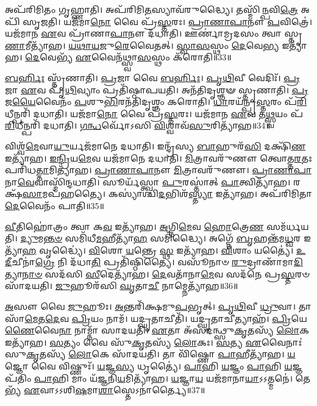 𑌅𑌪᳴𑌰𑌿𑌮𑌿𑌤𑌂 𑌗𑍃𑌹𑍍𑌣𑌾𑌤𑌿।
𑌅𑌪᳴𑌰𑌿𑌮𑌿\-\ul{𑌤}\-𑌸𑍍𑌯𑌾𑌵᳴𑌰𑍁𑌦𑍍𑌧𑍍𑌯𑍈।
𑌤𑌸𑍍𑌮𑌿᳴\-\ul{𑌨𑍍𑌪}\-𑌵𑌿\-\ul{𑌤𑍍𑌰𑍇} 𑌅𑌪𑌿᳴ 𑌸𑍃𑌜𑌤𑌿।
𑌯𑌜᳴𑌮𑌾\-\ul{𑌨𑍋} 𑌵𑍈 𑌪𑍍𑌰᳴\-\ul{𑌸𑍍𑌤}\-𑌰𑌃।
\-\ul{𑌪𑍍𑌰𑌾}\-\-\ul{𑌣𑌾}\-\-\ul{𑌪𑌾}\-𑌨𑍗 \ul{𑌪}\-𑌵𑌿𑌤𑍍𑌰𑍇॑।
𑌯𑌜᳴𑌮𑌾𑌨 \ul{𑌏}\-𑌵 𑌪𑍍𑌰𑌾᳴𑌣𑌾\-\ul{𑌪𑌾}\-𑌨𑍗 𑌦᳴𑌧𑌾𑌤𑌿।
𑌊𑌰𑍍𑌣𑌾॑𑌮𑍍𑌰𑌦𑌸𑌂 𑌤𑍍𑌵𑌾 𑌸𑍍𑌤𑍃\-\ul{𑌣𑌾}\-𑌮𑍀𑌤𑍍𑌯𑌾᳴𑌹।
\-\ul{𑌯}\-\-\ul{𑌥𑌾}\-\-\ul{𑌯}\-𑌜𑍁\-\ul{𑌰𑍇}\-𑌵𑍈𑌤𑌤𑍍।
\-\ul{𑌸𑍍𑌵𑌾}\-\-\ul{𑌸}\-𑌸𑍍𑌥𑌂 \ul{𑌦𑍇}\-𑌵𑍇\-\ul{𑌭𑍍𑌯} 𑌇𑌤𑍍𑌯𑌾᳴𑌹।
\-\ul{𑌦𑍇}\-𑌵𑍇𑌭𑍍𑌯᳴ \ul{𑌏}\-𑌵𑍈𑌨᳴𑌥𑍍𑌸𑍍𑌵𑌾\-\ul{𑌸}\-𑌸𑍍𑌥𑌂 𑌕᳴𑌰𑍋𑌤𑌿॥33॥

\-\ul{𑌬}\-\-\ul{𑌰𑍍}\-𑌹𑌿𑌃 𑌸𑍍𑌤𑍃᳴𑌣𑌾𑌤𑌿।
\-\ul{𑌪𑍍𑌰}\-𑌜𑌾 𑌵𑍈 \ul{𑌬}\-\-\ul{𑌰𑍍}\-𑌹𑌿𑌃।
\-\ul{𑌪𑍃}\-\-\ul{𑌥𑌿}\-𑌵𑍀 𑌵𑍇𑌦𑌿𑌃᳴।
\-\ul{𑌪𑍍𑌰}\-𑌜𑌾 \ul{𑌏}\-𑌵 𑌪𑍃᳴\-\ul{𑌥𑌿}\-𑌵𑍍𑌯𑌾𑌂 𑌪𑍍𑌰𑌤𑌿᳴\-𑌷𑍍𑌠𑌾𑌪𑌯𑌤𑌿।
𑌅𑌨᳴𑌤𑌿𑌦𑍃𑌶𑍍𑌞𑍟 𑌸𑍍𑌤𑍃𑌣𑌾𑌤𑌿।
\-\ul{𑌪𑍍𑌰}\-𑌜\-\ul{𑌯𑍈}\-𑌵𑍈𑌨𑌂᳴ \ul{𑌪}\-𑌶𑍁\-\ul{𑌭𑌿}\-𑌰𑌨᳴𑌤𑌿𑌦𑍃𑌶𑍍𑌞𑌂 𑌕𑌰𑍋𑌤𑌿।
\-\ul{𑌧𑌾}\-𑌰𑌯᳴𑌨𑍍𑌪𑍍𑌰\-\ul{𑌸𑍍𑌤}\-𑌰𑌂 𑌪᳴\-\ul{𑌰𑌿}\-𑌧𑍀𑌨𑍍𑌪𑌰𑌿᳴ 𑌦𑌧𑌾𑌤𑌿।
𑌯𑌜᳴𑌮𑌾\-\ul{𑌨𑍋} 𑌵𑍈 𑌪𑍍𑌰᳴\-\ul{𑌸𑍍𑌤}\-𑌰𑌃।
𑌯𑌜᳴𑌮𑌾𑌨 \ul{𑌏}\-𑌵 𑌤\-\ul{𑌥𑍍𑌸𑍍𑌵}\-𑌯𑌂 𑌪᳴\-\ul{𑌰𑌿}\-𑌧𑍀𑌨𑍍𑌪𑌰𑌿᳴ 𑌦𑌧𑌾𑌤𑌿।
\-\ul{𑌗}\-\-\ul{𑌨𑍍𑌧}\-𑌰𑍍𑌵𑍋᳴𑌽𑌸𑌿 \ul{𑌵𑌿}\-𑌶𑍍𑌵𑌾𑌵᳴\-\ul{𑌸𑍁}\-𑌰𑌿𑌤𑍍𑌯𑌾᳴𑌹॥34॥

𑌵𑌿𑌶𑍍𑌵᳴\-\ul{𑌮𑍇}\-𑌵𑌾\-\ul{𑌯𑍁}\-𑌰𑍍𑌯𑌜᳴𑌮𑌾𑌨𑍇 𑌦𑌧𑌾𑌤𑌿।
𑌇𑌨𑍍𑌦𑍍𑌰᳴𑌸𑍍𑌯 \ul{𑌬𑌾}\-𑌹𑍁𑌰᳴\-\ul{𑌸𑌿} 𑌦𑌕𑍍𑌷𑌿᳴\-\ul{𑌣} 𑌇𑌤𑍍𑌯𑌾᳴𑌹।
\-\ul{𑌇}\-\-\ul{𑌨𑍍𑌦𑍍𑌰𑌿}\-𑌯\-\ul{𑌮𑍇}\-𑌵 𑌯𑌜᳴𑌮𑌾𑌨𑍇 𑌦𑌧𑌾𑌤𑌿।
\-\ul{𑌮𑌿}\-𑌤𑍍𑌰𑌾𑌵𑌰𑍁᳴𑌣𑍗 𑌤𑍍𑌵𑍋𑌤𑍍𑌤\-\ul{𑌰}\-𑌤𑌃 𑌪𑌰𑌿᳴𑌧\-\ul{𑌤𑍍𑌤𑌾}\-𑌮𑌿𑌤𑍍𑌯𑌾᳴𑌹।
\-\ul{𑌪𑍍𑌰𑌾}\-\-\ul{𑌣𑌾}\-\-\ul{𑌪𑌾}\-𑌨𑍗 \ul{𑌮𑌿}\-𑌤𑍍𑌰𑌾𑌵𑌰𑍁᳴𑌣𑍗।
\-\ul{𑌪𑍍𑌰𑌾}\-\-\ul{𑌣𑌾}\-\-\ul{𑌪𑌾}\-𑌨𑌾\-\-\ul{𑌵𑍇}\-𑌵𑌾𑌸𑍍𑌮𑌿᳴𑌨𑍍𑌦\-𑌧𑌾𑌤𑌿।
𑌸𑍂𑌰𑍍𑌯᳴𑌸𑍍𑌤𑍍𑌵𑌾 \ul{𑌪𑍁}\-𑌰𑌸𑍍𑌤𑌾॑𑌤𑍍 \ul{𑌪𑌾}\-𑌤𑍍𑌵𑌿𑌤𑍍𑌯𑌾᳴𑌹।
𑌰𑌕𑍍𑌷᳴\-\ul{𑌸𑌾}\-𑌮𑌪᳴𑌹𑌤𑍍𑌯𑍈।
𑌕𑌸𑍍𑌯𑌾॑𑌶𑍍𑌚𑌿\-\ul{𑌦}\-𑌭𑌿𑌶᳴\-\ul{𑌸𑍍𑌤𑍍𑌯𑌾} 𑌇𑌤𑍍𑌯𑌾᳴𑌹।
𑌅𑌪᳴𑌰𑌿𑌮𑌿𑌤𑌾\-\ul{𑌦𑍇}\-𑌵𑍈𑌨𑌂᳴ 𑌪𑌾𑌤𑌿॥35॥

\-\ul{𑌵𑍀}\-𑌤𑌿𑌹𑍋॑𑌤𑍍𑌰𑌂 𑌤𑍍𑌵𑌾 𑌕\-\ul{𑌵} 𑌇𑌤𑍍𑌯𑌾᳴𑌹।
\-\ul{𑌅}\-𑌗𑍍𑌨𑌿\-\ul{𑌮𑍇}\-𑌵 \ul{𑌹𑍋}\-𑌤𑍍𑌰𑍇\-\ul{𑌣} 𑌸𑌮᳴𑌰𑍍𑌧𑌯𑌤𑌿।
\-\ul{𑌦𑍍𑌯𑍁}\-𑌮\-\ul{𑌨𑍍𑌤}\-\-\ul{𑍞} 𑌸𑌮𑌿᳴𑌧𑍀\-\ul{𑌮}\-𑌹𑍀𑌤𑍍𑌯𑌾᳴\-\ul{𑌹} 𑌸𑌮𑌿᳴𑌦𑍍𑌧𑍍𑌯𑍈।
𑌅𑌗𑍍𑌨𑍇᳴ \ul{𑌬𑍃}\-𑌹𑌨𑍍𑌤᳴𑌮\-\ul{𑌧𑍍𑌵}\-𑌰 𑌇𑌤𑍍𑌯𑌾᳴\-\ul{𑌹} 𑌵𑍃𑌦𑍍𑌧𑍍𑌯𑍈॑।
\-\ul{𑌵𑌿}\-𑌶𑍋 \ul{𑌯}\-𑌨𑍍𑌤𑍍𑌰𑍇 \ul{𑌸𑍍𑌥} 𑌇𑌤𑍍𑌯𑌾᳴𑌹।
\-\ul{𑌵𑌿}\-𑌶𑌾𑌂 𑌯𑌤𑍍𑌯𑍈॑।
\-\ul{𑌉}\-\-\ul{𑌦𑍀}\-𑌚𑍀𑌨𑌾॑\-\ul{𑌗𑍍𑌰𑍇} 𑌨𑌿 𑌦᳴𑌧𑌾\-\ul{𑌤𑌿} 𑌪𑍍𑌰𑌤𑌿᳴\-𑌷𑍍𑌠𑌿𑌤𑍍𑌯𑍈।
𑌵𑌸𑍂᳴𑌨𑌾𑍞 \ul{𑌰𑍁}\-𑌦𑍍𑌰𑌾𑌣𑌾᳴𑌮𑌾\-\ul{𑌦𑌿}\-𑌤𑍍𑌯𑌾\-\ul{𑌨𑌾}\-\-\ul{𑍞} 𑌸𑌦᳴𑌸𑌿 \ul{𑌸𑍀}\-𑌦𑍇𑌤𑍍𑌯𑌾᳴𑌹।
\-\ul{𑌦𑍇}\-𑌵𑌤𑌾᳴𑌨𑌾\-\ul{𑌮𑍇}\-𑌵 𑌸𑌦᳴𑌨𑍇 𑌪𑍍𑌰\-\ul{𑌸𑍍𑌤}\-𑌰𑍞 𑌸𑌾᳴𑌦𑌯𑌤𑌿।
\-\ul{𑌜𑍁}\-𑌹𑍂𑌰᳴𑌸𑌿 \ul{𑌘𑍃}\-𑌤𑌾\-\ul{𑌚𑍀} 𑌨𑌾𑌮𑍍𑌨𑍇𑌤𑍍𑌯𑌾᳴𑌹॥36॥

\-\ul{𑌅}\-𑌸𑍗 𑌵𑍈 \ul{𑌜𑍁}\-𑌹𑍂𑌃।
\-\ul{𑌅}\-𑌨𑍍𑌤𑌰𑌿᳴𑌕𑍍𑌷𑌮𑍁\-\ul{𑌪}\-𑌭𑍃𑌤𑍍।
\-\ul{𑌪𑍃}\-\-\ul{𑌥𑌿}\-𑌵𑍀 \ul{𑌧𑍍𑌰𑍁}\-𑌵𑌾।
𑌤𑌾𑌸𑌾᳴\-\ul{𑌮𑍇}\-𑌤\-\ul{𑌦𑍇}\-𑌵 \ul{𑌪𑍍𑌰𑌿}\-𑌯𑌂 𑌨𑌾𑌮᳴।
𑌯𑌦𑍍\mbox{}\-\ul{𑌘𑍃}\-𑌤𑌾𑌚𑍀𑌤𑌿᳴।
𑌯𑌦𑍍\mbox{}\-\ul{𑌘𑍃}\-𑌤𑌾𑌚𑍀𑌤𑍍𑌯𑌾𑌹᳴।
\-\ul{𑌪𑍍𑌰𑌿}\-𑌯𑍇\-\ul{𑌣𑍈}\-𑌵𑍈\-\ul{𑌨𑌾} 𑌨𑌾𑌮𑍍𑌨𑌾᳴ 𑌸𑌾𑌦𑌯𑌤𑌿।
\-\ul{𑌏}\-𑌤𑌾 𑌅᳴𑌸𑌦𑌨𑍍𑌥𑍍𑌸𑍁\-\ul{𑌕𑍃}\-𑌤𑌸𑍍𑌯᳴ \ul{𑌲𑍋}\-𑌕 𑌇𑌤𑍍𑌯𑌾᳴𑌹।
\-\ul{𑌸}\-𑌤𑍍𑌯𑌂 𑌵𑍈 𑌸𑍁᳴\-\ul{𑌕𑍃}\-𑌤𑌸𑍍𑌯᳴ \ul{𑌲𑍋}\-𑌕𑌃।
\-\ul{𑌸}\-𑌤𑍍𑌯 \ul{𑌏}\-𑌵𑍈𑌨𑌾𑌃॑ 𑌸𑍁\-\ul{𑌕𑍃}\-𑌤𑌸𑍍𑌯᳴ \ul{𑌲𑍋}\-𑌕𑍇 𑌸𑌾᳴𑌦𑌯𑌤𑌿।
𑌤𑌾 𑌵𑌿᳴𑌷𑍍𑌣𑍋 \ul{𑌪𑌾}\-𑌹𑍀𑌤𑍍𑌯𑌾᳴𑌹।
\-\ul{𑌯}\-𑌜𑍍𑌞𑍋 𑌵𑍈 𑌵𑌿𑌷𑍍𑌣𑍁𑌃᳴।
\-\ul{𑌯}\-𑌜𑍍𑌞\-\ul{𑌸𑍍𑌯} 𑌧𑍃𑌤𑍍𑌯𑍈॑।
\-\ul{𑌪𑌾}\-𑌹𑌿 \ul{𑌯}\-𑌜𑍍𑌞𑌂 \ul{𑌪𑌾}\-𑌹𑌿 \ul{𑌯}\-𑌜𑍍𑌞𑌪᳴𑌤𑌿𑌂 \ul{𑌪𑌾}\-𑌹𑌿 𑌮𑌾𑌂 𑌯᳴\-\ul{𑌜𑍍𑌞}\-𑌨𑌿\-\ul{𑌯}\-𑌮𑌿𑌤𑍍𑌯𑌾᳴𑌹।
\-\ul{𑌯}\-𑌜𑍍𑌞𑌾\-\ul{𑌯} 𑌯𑌜᳴𑌮𑌾𑌨𑌾\-\ul{𑌯𑌾}\-𑌽𑌽𑌤𑍍𑌮𑌨𑍇॑।
𑌤𑍇𑌭𑍍𑌯᳴ \ul{𑌏}\-𑌵𑌾𑌽𑌽𑌶𑌿\-\ul{𑌷}\-𑌮𑌾\-\ul{𑌶𑌾}\-𑌸𑍍𑌤𑍇\-𑌽𑌨𑌾॑𑌰𑍍𑌤𑍍𑌯𑍈॥37॥\anuvakamend[𑌸𑍍𑌥𑍇𑌤𑍍𑌯𑌾᳴𑌹 𑌪𑍃\-\ul{𑌥𑌿}\-𑌵𑍀 𑌵𑍇\-\ul{𑌦𑌿}\-𑌰𑍍𑌯𑌨𑍍𑌤𑌿᳴ \ul{𑌕𑍍𑌰𑌿}\-𑌯\-\ul{𑌤𑍇} 𑌵𑍀𑌣𑍁᳴\-\ul{𑌰𑍍𑌵𑍀}\-𑌰𑍍𑌯᳴𑌸𑌮𑍍𑌮𑌿𑌤𑌂 𑌕𑌰𑍋𑌤𑍍𑌯𑌾𑌹 𑌪𑌾\-\ul{𑌤𑌿} 𑌨𑌾𑌮𑍍𑌨𑍇𑌤𑍍𑌯𑌾᳴𑌹 \ul{𑌲𑍋}\-𑌕𑍇 𑌸𑌾᳴𑌦𑌯\-\ul{𑌤𑌿} 𑌷𑌟𑍍 𑌚᳴]

